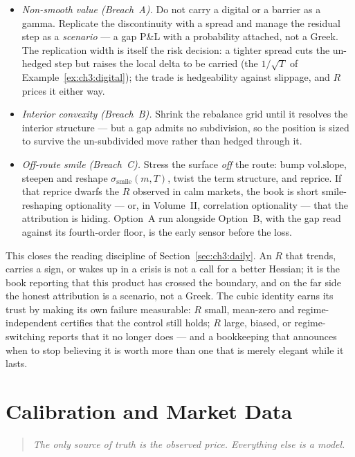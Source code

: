 \documentclass[11pt]{book}
\theoremstyle{plain}
\theoremstyle{definition}
\theoremstyle{remark}
\newcommand{\mln}{m}                             %
\newcommand{\ssm}{\sigma_{\mathrm{smile}}}       %
\newcommand{\volslope}{\mathrm{vol.slope}}       %
\begin{document}
\begin{itemize}
  \item \emph{Non-smooth value (Breach~A).} Do not carry a digital or a barrier
        as a gamma. Replicate the discontinuity with a spread and manage the
        residual step as a \emph{scenario} --- a gap P\&L with a probability
        attached, not a Greek. The replication width is itself the risk
        decision: a tighter spread cuts the un-hedged step but raises the local
        delta to be carried (the $1/\sqrt{T}$ of Example~\ref{ex:ch3:digital});
        the trade is hedgeability against slippage, and $R$ prices it either
        way.
  \item \emph{Interior convexity (Breach~B).} Shrink the rebalance grid until it
        resolves the interior structure --- but a gap admits no subdivision,
        so the position is sized to survive the un-subdivided move
        rather than hedged through it.
  \item \emph{Off-route smile (Breach~C).} Stress the surface \emph{off} the
        route: bump $\volslope$, steepen and reshape $\ssm(\mln,T)$, twist the
        term structure, and reprice. If that reprice dwarfs the $R$ observed
        in calm markets, the book is short smile-reshaping optionality --- or,
        in Volume~II, correlation optionality --- that the attribution is
        hiding. Option~A run alongside Option~B, with the gap read
        against its fourth-order floor, is the early sensor before the
        loss.
\end{itemize}

This closes the reading discipline of Section~\ref{sec:ch3:daily}. An $R$ that
trends, carries a sign, or wakes up in a crisis is not a call for a better
Hessian; it is the book reporting that this product has crossed the boundary,
and on the far side the honest attribution is a scenario, not a Greek. The
cubic identity earns its trust by making its own failure measurable:
$R$ small, mean-zero and regime-independent certifies that the
control still holds; $R$ large, biased, or regime-switching reports that it no
longer does --- and a bookkeeping that announces when to stop
believing it is worth more than one that is merely elegant while it lasts.
\chapter{Calibration and Market Data}
\label{ch:calibration}

\begin{quote}
\itshape The only source of truth is the observed price. Everything else is a model.
\end{quote}
\end{document}
